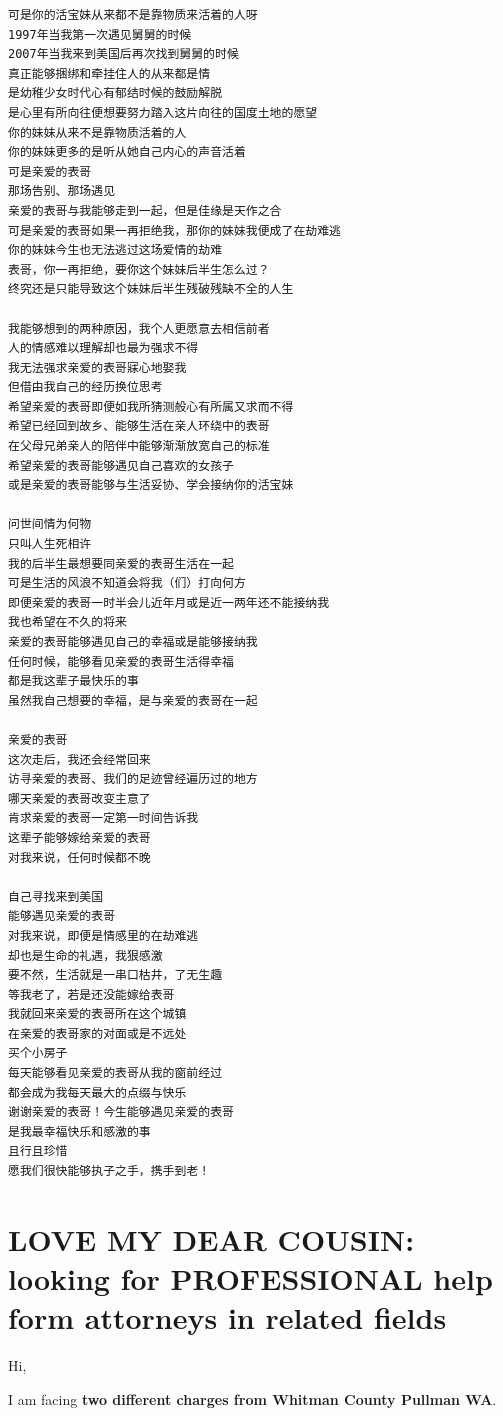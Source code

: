 \documentclass[9pt, b5paaper]{book}
\begin{document}
\begin{itemize}
\begin{verbatim}
可是你的活宝妹从来都不是靠物质来活着的人呀
1997年当我第一次遇见舅舅的时候
2007年当我来到美国后再次找到舅舅的时候
真正能够捆绑和牵挂住人的从来都是情
是幼稚少女时代心有郁结时候的鼓励解脱
是心里有所向往便想要努力踏入这片向往的国度土地的愿望
你的妹妹从来不是靠物质活着的人
你的妹妹更多的是听从她自己内心的声音活着
可是亲爱的表哥
那场告别、那场遇见
亲爱的表哥与我能够走到一起，但是佳缘是天作之合
可是亲爱的表哥如果一再拒绝我，那你的妹妹我便成了在劫难逃
你的妹妹今生也无法逃过这场爱情的劫难
表哥，你一再拒绝，要你这个妹妹后半生怎么过？
终究还是只能导致这个妹妹后半生残破残缺不全的人生

我能够想到的两种原因，我个人更愿意去相信前者
人的情感难以理解却也最为强求不得
我无法强求亲爱的表哥寐心地娶我
但借由我自己的经历换位思考
希望亲爱的表哥即便如我所猜测般心有所属又求而不得
希望已经回到故乡、能够生活在亲人环绕中的表哥
在父母兄弟亲人的陪伴中能够渐渐放宽自己的标准
希望亲爱的表哥能够遇见自己喜欢的女孩子
或是亲爱的表哥能够与生活妥协、学会接纳你的活宝妹

问世间情为何物
只叫人生死相许
我的后半生最想要同亲爱的表哥生活在一起
可是生活的风浪不知道会将我（们）打向何方
即便亲爱的表哥一时半会儿近年月或是近一两年还不能接纳我
我也希望在不久的将来
亲爱的表哥能够遇见自己的幸福或是能够接纳我
任何时候，能够看见亲爱的表哥生活得幸福
都是我这辈子最快乐的事
虽然我自己想要的幸福，是与亲爱的表哥在一起

亲爱的表哥
这次走后，我还会经常回来
访寻亲爱的表哥、我们的足迹曾经遍历过的地方
哪天亲爱的表哥改变主意了
肯求亲爱的表哥一定第一时间告诉我
这辈子能够嫁给亲爱的表哥
对我来说，任何时候都不晚

自己寻找来到美国
能够遇见亲爱的表哥
对我来说，即便是情感里的在劫难逃
却也是生命的礼遇，我狠感激
要不然，生活就是一串口枯井，了无生趣
等我老了，若是还没能嫁给表哥
我就回来亲爱的表哥所在这个城镇
在亲爱的表哥家的对面或是不远处
买个小房子
每天能够看见亲爱的表哥从我的窗前经过
都会成为我每天最大的点缀与快乐
谢谢亲爱的表哥！今生能够遇见亲爱的表哥
是我最幸福快乐和感激的事
且行且珍惜
愿我们很快能够执子之手，携手到老！
\end{verbatim}
\end{itemize}

\chapter{LOVE MY DEAR COUSIN: looking for PROFESSIONAL help form attorneys in related fields}
\label{sec-5}
Hi, 

I am facing \textbf{two different charges from Whitman
County Pullman WA}. 
\end{document}
